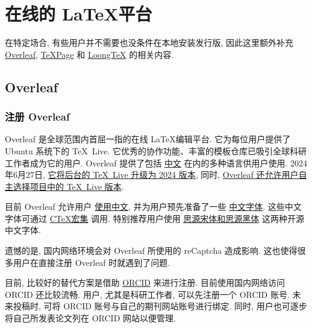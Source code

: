
\chapter{在线的 \LaTeX 平台}

在特定场合,
有些用户并不需要也没条件在本地安装发行版,
因此这里额外补充 \href{www.overleaf.com}{Overleaf},
\href{https://www.texpage.com}{TeXPage} 和
\href{https://www.loongtex.com}{LoongTeX} 的相关内容.

\section{Overleaf}

\subsection{注册 Overleaf}

Overleaf 是全球范围内首屈一指的在线 \LaTeX 编辑平台.
它为每位用户提供了 Ubuntu 系统下的 \TeX\ Live.
它优秀的协作功能、丰富的模板仓库已吸引全球科研工作者成为它的用户.
Overleaf 提供了包括%
\href{https://cn.overleaf.com}{中文}%
在内的多种语言供用户使用.
2024年6月27日,
\href{https://www.overleaf.com/blog/tex-live-2024-is-now-available}{它将后台的 \TeX\ Live 升级为 2024 版本},
同时,
\href{https://www.overleaf.com/blog/new-feature-select-your-tex-live-compiler-version}{Overleaf 还允许用户自主选择项目中的 \TeX\ Live 版本}.

目前 Overleaf 允许用户%
\href{https://www.overleaf.com/learn/latex/Chinese}{使用中文},
并为用户预先准备了一些%
\href{https://www.overleaf.com/learn/latex/Questions/Which_OTF_or_TTF_fonts_are_supported_via_fontspec%3F#Fonts_for_CJK}{中文字体}.
这些中文字体可通过%
\href{https://www.overleaf.com/latex/templates/using-the-ctex-package-on-overleaf-zai-overleafping-tai-shang-shi-yong-ctex/gndvpvsmjcqx}{C\TeX 宏集}%
调用.
特别推荐用户使用%
\href{https://www.overleaf.com/latex/examples/demonstration-of-noto-serif-cjk-and-noto-sans-cjk-fonts/sgrwgcddtqsq}{思源宋体和思源黑体}%
这两种开源中文字体.

遗憾的是,
国内网络环境会对 Overleaf 所使用的 reCaptcha 造成影响.
这也使得很多用户在直接注册 Overleaf 时就遇到了问题.

目前,
比较好的替代方案是借助 \href{https://orcid.org}{ORCID} 来进行注册.
目前使用国内网络访问 ORCID 还比较流畅.
用户, 尤其是科研工作者, 可以先注册一个 ORCID 账号.
未来投稿时,
可将 ORCID 账号与自己的期刊网站账号进行绑定.
同时,
用户也可逐步将自己所发表论文列在 ORCID 网站以便管理.

